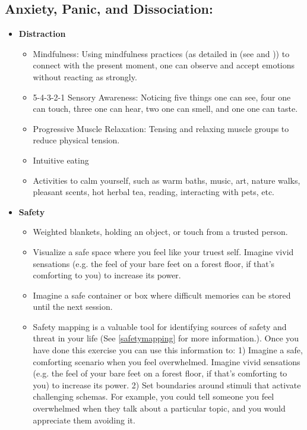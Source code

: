 \documentclass[12pt,letterpaper]{book}
\begin{document}
\subsection*{Anxiety, Panic, and Dissociation:}
\begin{itemize}
    \item \textbf{Distraction}
    \begin{itemize}
        \item Mindfulness: Using mindfulness practices (as detailed in (see \textcite{rain} and \textcite{bodyscan})) to connect with the present moment, one can observe and accept emotions without reacting as strongly.
        \item 5-4-3-2-1 Sensory Awareness: Noticing five things one can see, four one can touch, three one can hear, two one can smell, and one one can taste.
        \item Progressive Muscle Relaxation: Tensing and relaxing muscle groups to reduce physical tension.
        \item Intuitive eating
        \item Activities to calm yourself, such as warm baths, music, art, nature walks, pleasant scents, hot herbal tea, reading, interacting with pets, etc.
    \end{itemize}
    \item \textbf{Safety}
    \begin{itemize}
        \item Weighted blankets, holding an object, or touch from a trusted person.
        \item Visualize a safe space where you feel like your truest self. Imagine vivid sensations (e.g. the feel of your bare feet on a forest floor, if that's comforting to you) to increase its power.
        \item Imagine a safe container or box where difficult memories can be stored until the next session.
        \item Safety mapping is a valuable tool for identifying sources of safety and threat in your life (See \ref{safetymapping} for more information.). Once you have done this exercise you can use this information to: 1) Imagine a safe, comforting scenario when you feel overwhelmed. Imagine vivid sensations (e.g. the feel of your bare feet on a forest floor, if that's comforting to you) to increase its power. 2) Set boundaries around stimuli that activate challenging schemas. For example, you could tell someone you feel overwhelmed when they talk about a particular topic, and you would appreciate them avoiding it.

\end{itemize}
\end{itemize}
\end{document}
